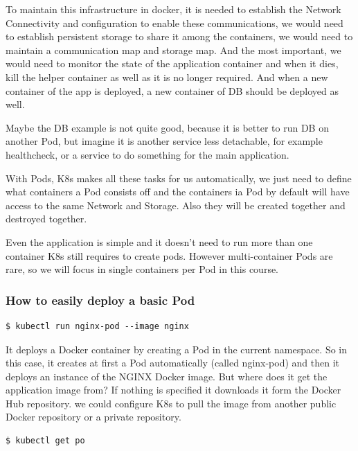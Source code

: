 \documentclass{article}
\newenvironment{blocktemplateI}[1]{%
    \tcolorbox[beamer,%
    noparskip,breakable,
    colframe=Violet,%
    colbacklower=Black,%
    title=#1]}%
    {\endtcolorbox}
\newenvironment{codetemplate}[1][]{%
  \mybasecolorbox[#1]
  \itshape
}{%
  \endmybasecolorbox
}
\begin{document}
To maintain this infrastructure in docker, it is needed to establish the Network Connectivity and configuration to enable these communications, we would need to establish persistent storage to share it among the containers, we would need to maintain a communication map and storage map. And the most important, we would need to monitor the state of the application container and when it dies, kill the helper container as well as it is no longer required. And when a new container of the app is deployed, a new container of DB should be deployed as well.

\begin{blocktemplateI}{Note}
Maybe the DB example is not quite good, because it is better to run DB on another Pod, but imagine it is another service less detachable, for example healthcheck, or a service to do something for the main application.
\end{blocktemplateI}

With Pods, K8s makes all these tasks for us automatically, we just need to define what containers a Pod consists off and the containers ia Pod by default will have access to the same Network and Storage. Also they will be created together and destroyed together.

Even the application is simple and it doesn't need to run more than one container K8s still requires to create pods. However multi-container Pods are rare, so we will focus in single containers per Pod in this course.

\subsubsection{How to easily deploy a basic Pod}

\begin{codetemplate}{}
\begin{verbatim}
$ kubectl run nginx-pod --image nginx
\end{verbatim}
\end{codetemplate}

It deploys a Docker container by creating a Pod in the current namespace. So in this case, it creates at first a Pod automatically (called nginx-pod) and then it deploys an instance of the NGINX Docker image. But where does it get the application image from? If nothing is specified it downloads it form the Docker Hub repository. we could configure K8s to pull the image from another public Docker repository or a private repository.


\begin{codetemplate}{}
\begin{verbatim}
$ kubectl get po
\end{verbatim}
\end{codetemplate}
\end{document}
